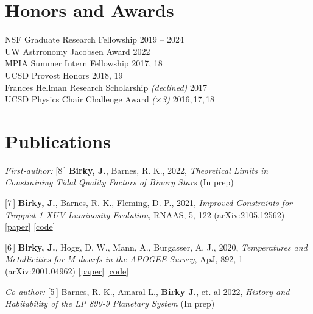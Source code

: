 \documentclass[margin,line]{resume}
\newcommand{\nlist}[1]{{\color{bcolor} [#1\,]}}
\begin{document}
\begin{resume}
\section{\mysidestyle \textcolor{bcolor}{Honors and Awards}}
NSF Graduate Research Fellowship \hfill 2019 -- 2024 \\
UW Astrronomy Jacobsen Award \hfill 2022 \\
MPIA Summer Intern Fellowship \hfill 2017, 18 \\
UCSD Provost Honors \hfill 2018, 19 \\
Frances Hellman Research Scholarship \textit{(declined)} \hfill 2017 \\
UCSD Physics Chair Challenge Award \textit{($\times$3)} \hfill 2016,\,17,\,18 


\section{\mysidestyle \textcolor{bcolor}{Publications}}

\textsl{First-author:} \vspace{.2cm} \newline
\nlist{8} \textbf{Birky, J.}, Barnes, R. K., 2022, \textsl{Theoretical Limits in Constraining Tidal Quality Factors of Binary Stars} (In prep)

\nlist{7} \textbf{Birky, J.}, Barnes, R. K., Fleming, D. P., 2021, \textsl{Improved Constraints for Trappist-1 XUV Luminosity Evolution}, RNAAS, 5, 122 (arXiv:2105.12562)  [\href{https://iopscience.iop.org/article/10.3847/2515-5172/ac034c}{paper}] [\href{https://github.com/jbirky/trappist_xuv}{code}]

\nlist{6} \textbf{Birky, J.}, Hogg, D. W., Mann, A., Burgasser, A. J., 2020, \textsl{Temperatures and Metallicities for M dwarfs in the APOGEE Survey}, ApJ, 892, 1 (arXiv:2001.04962) [\href{https://iopscience.iop.org/article/10.3847/1538-4357/ab7004}{paper}] [\href{https://github.com/jbirky/Mdwarf_project}{code}]

\textsl{Co-author:} \vspace{.2cm} \newline
\nlist{5} Barnes, R. K., Amaral L., \textbf{Birky J.}, et. al 2022, \textsl{History and Habitability of the LP 890-9 Planetary System} (In prep) 


\end{resume}
\end{document}
